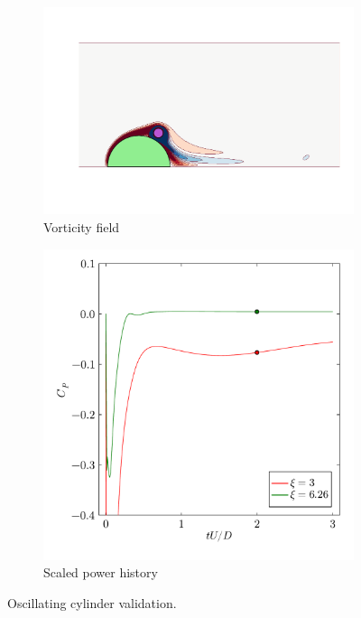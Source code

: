 \documentclass[10pt,a4paper]{article}
\begin{document}
\begin{figure}[!t]
  \centering
    \begin{subfigure}[t]{0.48\linewidth}
        \centering
        \includegraphics[width=\linewidth,trim={50 70 20 210},clip]{img/SpinCylFlood.pdf}
        \vspace{-1cm}
        \caption{Vorticity field}
    \end{subfigure}
    \begin{subfigure}[b]{0.48\linewidth}
        \includegraphics[width=\linewidth]{img/SpinCylHist.pdf}
        \vspace{-1cm}
        \caption{Scaled power history}
    \end{subfigure}\hspace{20pt}
  \caption{Oscillating cylinder validation.}
  \label{fig:cyl_val}
\end{figure}
\end{document}
